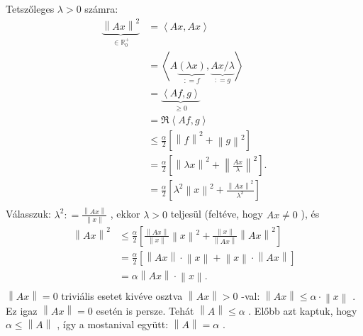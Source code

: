 \documentclass[12pt,a4paper]{scrartcl}
\newenvironment{bizonyitas}{}{}
\begin{document}
\begin{bizonyitas}
Tetszőleges \(\lambda > 0\) számra: \[\begin{aligned}
  \underbrace {{{\left\| {Ax} \right\|}^2}}_{ \in \mathbb{R}_0^ + } &  = \left\langle {Ax,Ax} \right\rangle  \\ 
   &  = \left\langle {A\underbrace {\left( {\lambda x} \right)}_{: = f},\underbrace {Ax/\lambda }_{: = g}} \right\rangle  \\ 
   &  = \underbrace {\left\langle {Af,g} \right\rangle }_{ \geqslant 0} \\ 
   &  = \Re \left\langle {Af,g} \right\rangle  \\ 
   &  \leqslant \frac{\alpha }{2}\left[ {{{\left\| f \right\|}^2} + {{\left\| g \right\|}^2}} \right] \\ 
   &  = \frac{\alpha }{2}\left[ {{{\left\| {\lambda x} \right\|}^2} + {{\left\| {\frac{{Ax}}{\lambda }} \right\|}^2}} \right]. \\ 
   &  = \frac{\alpha }{2}\left[ {{\lambda ^2}{{\left\| x \right\|}^2} + \frac{{{{\left\| {Ax} \right\|}^2}}}{{{\lambda ^2}}}} \right] \\ 
\end{aligned} \] Válasszuk:
\(\lambda^{2}: = \frac{\left\| {Ax} \right\|}{\left\| x \right\|}\) ,
ekkor \(\lambda > 0\) teljesül (feltéve, hogy \(Ax \neq 0\) ), és
\[\begin{aligned}
  {\left\| {Ax} \right\|^2} &  \leqslant \frac{\alpha }{2}\left[ {\frac{{\left\| {Ax} \right\|}}{{\left\| x \right\|}}{{\left\| x \right\|}^2} + \frac{{\left\| x \right\|}}{{\left\| {Ax} \right\|}}{{\left\| {Ax} \right\|}^2}} \right] \\ 
   &  = \frac{\alpha }{2}\left[ {\left\| {Ax} \right\| \cdot \left\| x \right\| + \left\| x \right\| \cdot \left\| {Ax} \right\|} \right] \\ 
   &  = \alpha \left\| {Ax} \right\| \cdot \left\| x \right\| .\\ 
\end{aligned} \] \(\left\| {Ax} \right\| = 0\) triviális esetet kivéve
osztva \(\left\| {Ax} \right\| > 0\) -val:
\(\left\| {Ax} \right\| \leq \alpha \cdot \left\| x \right\|\) . Ez igaz
\(\left\| {Ax} \right\| = 0\) esetén is persze. Tehát
\(\left\| A \right\| \leq \alpha\) . Előbb azt kaptuk, hogy
\(\alpha \leq \left\| A \right\|\) , így a mostanival együtt:
\(\left\| A \right\| = \alpha\) .

\end{bizonyitas}
\end{document}
